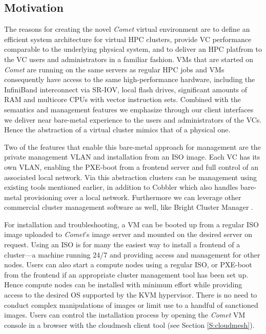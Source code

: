 
\subsection{Motivation} \label{S:motivation}

The reasons for creating the novel {\em Comet} virtual environment are
to define an efficient system architecture for virtual HPC clusters,
provide VC performance comparable to the underlying physical system,
and to deliver an HPC platfrom to the VC users and administrators in a
familiar fashion. VMs that are started on {\em Comet} are running on the same servers as regular
HPC jobs and VMs consequently have access to the same high-performance
hardware, including the InfiniBand interconnect via SR-IOV, local flash
drives, significant amounts of RAM and multicore CPUs with vector
instruction sets. Combined with the semantics and management
features we emphasize through our client interfaces we deliver near bare-metal
experience to the users and administrators of the VCs.  Hence the
abstraction of a virtual cluster mimics that of a physical one.

Two of the features that enable this bare-metal approach for
management are the private management VLAN and installation from an
ISO image. Each VC has its own VLAN, enabling the PXE-boot from a
frontend server and full control of an associated local network.  Via
this abstraction clusters can be management using existing tools
mentioned earlier, in addition to Cobbler \cite{cobbler} which also handles
bare-metal provisioning over a local network. Furthermore
we can leverage other commercial cluster management software as well,
like Bright Cluster Manager \cite{bright}.

For installation and troubleshooting, a VM can be booted up from a
regular ISO image uploaded to {\em Comet}'s
image server and mounted on the desired server on request. Using an
ISO is for many the easiest way to install a frontend of a cluster---a
machine running 24/7 and providing access and management for other
nodes. Users can also start a compute nodes using a regular ISO, or
PXE-boot from the frontend if an appropriate cluster management tool
has been set up. Hence compute nodes can be installed with minimum
effort while providing access to the desired OS supported by the KVM
hypervisor. There is no need to conduct complex manipulations of
images or limit use to a handful of sanctioned images. Users can
control the installation process by opening the {\em Comet} VM
console in a browser with the cloudmesh client tool (see Section \ref{S:cloudmesh}).

